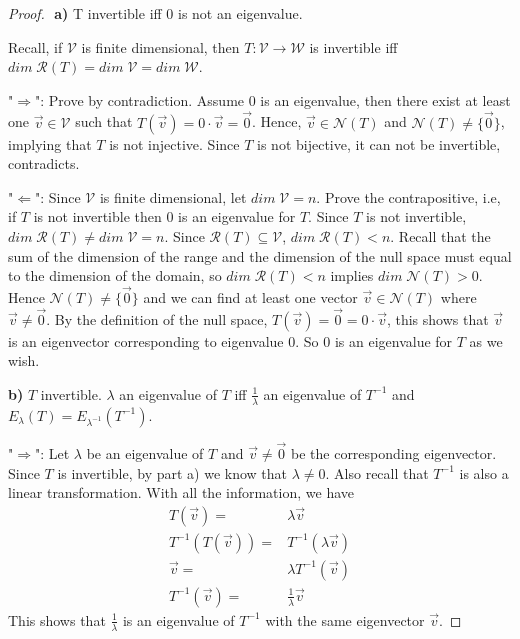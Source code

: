 \documentclass{article}
\begin{document}
\begin{proof}
$ $\newline
\textbf{a)} T invertible iff 0 is not an eigenvalue.
\smallskip

Recall, if $\mathcal{V}$ is finite dimensional, then $T: \mathcal{V} \to \mathcal{W}$ is invertible iff $dim \; \mathcal{R}(T) = dim \; \mathcal{V} = dim \; \mathcal{W}$.
\smallskip

"$\Rightarrow$": Prove by contradiction. Assume 0 is an eigenvalue, then there exist at least one $\vec{v} \in \mathcal{V}$ such that $T(\vec{v}) = 0 \cdot \vec{v} = \vec{0}$. Hence, $\vec{v} \in \mathcal{N}(T)$ and $\mathcal{N}(T) \ne \{ \vec{0} \}$, implying that $T$ is not injective. Since $T$ is not bijective, it can not be invertible, contradicts.
\smallskip

"$\Leftarrow$": Since $\mathcal{V}$ is finite dimensional, let $dim \; \mathcal{V} = n$. Prove the contrapositive, i.e, if $T$ is not invertible then 0 is an eigenvalue for $T$. Since $T$ is not invertible, $dim \; \mathcal{R}(T) \ne dim \; \mathcal{V} = n$. Since $\mathcal{R}(T) \subseteq \mathcal{V}$, $dim \; \mathcal{R}(T) < n$. Recall that the sum of the dimension of the range and the dimension of the null space must equal to the dimension of the domain, so $dim \; \mathcal{R}(T) < n$ implies $dim \; \mathcal{N}(T) >0$. Hence $\mathcal{N}(T) \ne \{ \vec{0} \}$ and we can find at least one vector $\vec{v} \in \mathcal{N}(T)$ where $\vec{v} \ne \vec{0}$. By the definition of the null space, $T(\vec{v}) = \vec{0} = 0 \cdot \vec{v}$, this shows that $\vec{v}$ is an eigenvector corresponding to eigenvalue 0. So 0 is an eigenvalue for $T$ as we wish.
\bigskip

\textbf{b)} $T$ invertible. $\lambda$ an eigenvalue of $T$ iff $\frac{1}{\lambda}$ an eigenvalue of $T^{-1}$ and $E_{\lambda}(T) = E_{\lambda^{-1}}(T^{-1})$.
\smallskip

"$\Rightarrow$": Let $\lambda$ be an eigenvalue of $T$ and $\vec{v} \ne \vec{0}$ be the corresponding eigenvector. Since $T$ is invertible, by part a) we know that $\lambda \ne 0$. Also recall that $T^{-1}$ is also a linear transformation. With all the information, we have
\begin{align*}
T(\vec{v}) =& \lambda \vec{v} \\
T^{-1}(T(\vec{v})) =& T^{-1}(\lambda \vec{v}) \\
\vec{v} =& \lambda T^{-1}(\vec{v}) \\
T^{-1}(\vec{v}) =& \frac{1}{\lambda} \vec{v}
\end{align*}
This shows that $\frac{1}{\lambda}$ is an eigenvalue of $T^{-1}$ with the same eigenvector $\vec{v}$.
\smallskip


\end{proof}
\end{document}
